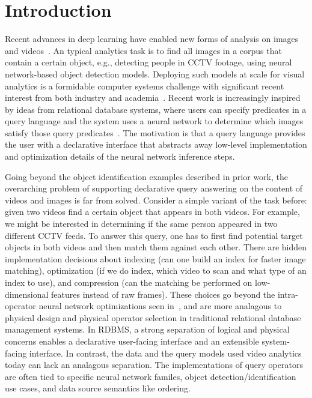 \section{Introduction}\label{intro}\sloppy
Recent advances in deep learning have enabled new forms of analysis on images and videos~\cite{lecun2015deep}. 
An typical analytics task is to find all images in a corpus that contain a certain object, e.g., detecting people in CCTV footage, using neural network-based object detection models.  
Deploying such models at scale for visual analytics is a formidable computer systems challenge with significant recent interest from both industry and academia~\cite{kang2017noscope, anderson2018predicate, kang2018blazeit, chetlur2014cudnn, fengeva, zhang2018ffs, anderson2018physical, jiang2018mainstream, jiang2018chameleon}. 
Recent work is increasingly inspired by ideas from relational database systems, where users can specify predicates in a query language and the system uses a neural network to determine which images satisfy those query predicates~\cite{kang2018blazeit,wu2018querying}.
The motivation is that a query language provides the user with a declarative interface that abstracts away low-level implementation and optimization details of the neural network inference steps.

Going beyond the object identification examples described in prior work, the overarching problem of supporting declarative query answering on the content of videos and images is far from solved. 
Consider a simple variant of the task before: given two videos find a certain object that appears in both videos. For example, we might be interested in determining if the same person appeared in two different CCTV feeds. To answer this query, one has to first find potential target objects in both videos and then match them against each other. There are hidden implementation decisions about indexing (can one build an index for faster image matching), optimization (if we do index, which video to scan and what type of an index to use), and compression (can the matching be performed on low-dimensional features instead of raw frames). These choices go beyond the intra-operator neural network optimizations seen in~\cite{kang2017noscope, anderson2018predicate, kang2018blazeit}, and are more analagous to physical design and physical operator selection in traditional relational database management systems. In RDBMS, a strong separation of logical and physical concerns enables a declarative user-facing interface and an extensible system-facing interface. In contrast, the data and the query models used video analytics today can lack an analagous separation. The implementations of query operators are often tied to specific neural network familes, object detection/identification use cases, and data source semantics like ordering.

